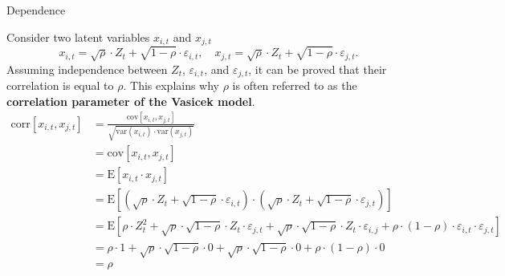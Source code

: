 \documentclass{beamer}
\begin{document}
\begin{frame}{Dependence}
\justifying
\small

Consider two latent variables $x_{i, t}$ and $x_{j, t}$
{\tiny
\begin{equation*}
x_{i,t} = \sqrt{\rho}\cdot Z_t + \sqrt{1 - \rho} \cdot \varepsilon_{i,t}, \quad x_{j,t} = \sqrt{\rho} \cdot Z_t + \sqrt{1 - \rho} \cdot \varepsilon_{j,t}.
\end{equation*}
}
Assuming independence between $Z_t$, $\varepsilon_{i, t}$, and $\varepsilon_{j, t}$, it can be proved that their correlation is equal to $\rho$. This explains why $\rho$ is often referred to as the \textbf{correlation parameter of the Vasicek model}.
{\tiny
\begin{align*}
\mathrm{corr}[x_{i, t}, x_{j, t}] &= \frac{\mathrm{cov}[x_{i, t}, x_{j, t}]}{\sqrt{\mathrm{var}(x_{i,t})\cdot  \mathrm{var}(x_{j, t})}} \nonumber \\
&= \mathrm{cov}[x_{i, t}, x_{j, t}] \nonumber \\
&= \mathrm{E}[x_{i, t} \cdot x_{j, t}] \nonumber \\
&= \mathrm{E}[(\sqrt{\rho} \cdot Z_t + \sqrt{1 - \rho} \cdot \varepsilon_{i, t}) \cdot (\sqrt{\rho} \cdot Z_t + \sqrt{1 - \rho} \cdot \varepsilon_{j, t})] \nonumber \\
&= \mathrm{E}[\rho \cdot Z_t^2 + \sqrt{\rho} \cdot \sqrt{1 - \rho} \cdot Z_t \cdot \varepsilon_{j, t} + \sqrt{\rho} \cdot \sqrt{1 - \rho} \cdot Z_t \cdot \varepsilon_{i, j} + \rho \cdot (1 - \rho) \cdot \varepsilon_{i, t} \cdot \varepsilon_{j, t}] \nonumber \\
&= \rho \cdot 1 + \sqrt{\rho} \cdot \sqrt{1 - \rho} \cdot 0 + \sqrt{\rho} \cdot \sqrt{1 - \rho} \cdot 0 + \rho \cdot (1 - \rho) \cdot 0 \nonumber \\
&= \rho
\end{align*}
}

\end{frame}
\end{document}
